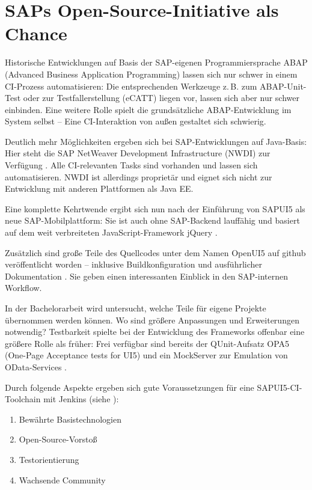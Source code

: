 \section{SAPs Open-Source-Initiative als Chance}
Historische Entwicklungen auf Basis der SAP-eigenen Programmiersprache ABAP
(Advanced Business Application Programming) lassen sich nur schwer in einem
CI-Prozess automatisieren: Die entsprechenden Werkzeuge z.\,B. zum
ABAP-Unit-Test \cite{Majer2009} oder zur Testfallerstellung (eCATT) liegen vor,
lassen sich aber nur schwer einbinden. Eine weitere Rolle spielt die
grundsätzliche ABAP-Entwicklung im System selbst -- Eine CI-Interaktion von
außen gestaltet sich schwierig.

Deutlich mehr Möglichkeiten ergeben sich bei SAP-Entwicklungen auf Java-Basis:
Hier steht die SAP NetWeaver Development Infrastructure (NWDI) zur Verfügung
\cite{Chan2011}.
Alle CI-relevanten Tasks sind vorhanden und lassen sich automatisieren.
NWDI ist allerdings proprietär und eignet sich nicht zur Entwicklung mit anderen
Plattformen als Java EE.

Eine komplette Kehrtwende ergibt sich nun nach der Einführung von SAPUI5 als
neue SAP-Mobilplattform: Sie ist auch ohne SAP-Backend lauffähig und basiert auf
dem weit verbreiteten JavaScript-Framework jQuery \cite{Antolovic2014}.

Zusätzlich sind große Teile des Quellcodes unter dem Namen OpenUI5 auf github
veröffentlicht worden -- inklusive Buildkonfiguration und ausführlicher
Dokumentation \cite{SAP2014_1}. Sie geben einen interessanten Einblick in den
SAP-internen Workflow. 

In der Bachelorarbeit wird untersucht, welche Teile für
eigene Projekte übernommen werden können. Wo sind größere Anpassungen und
Erweiterungen notwendig? Testbarkeit spielte bei der Entwicklung des Frameworks offenbar eine größere
Rolle als früher: Frei verfügbar sind bereits der QUnit-Aufsatz OPA5 (One-Page
Acceptance tests for UI5) und ein MockServer zur Emulation von OData-Services
\cite{BoennenDreesFischerHeinzStrothmann2014}.

Durch folgende Aspekte ergeben sich gute Voraussetzungen für eine SAPUI5-CI-Toolchain mit Jenkins
(siehe ):
\begin{enumerate}
	\item Bewährte Basistechnologien
	\item Open-Source-Vorstoß
	\item Testorientierung
	\item Wachsende Community
\end{enumerate}

